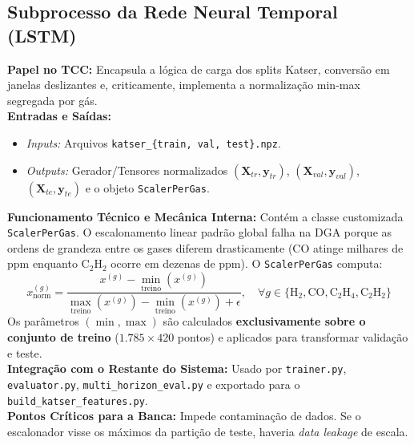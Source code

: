 \documentclass[10pt,a4paper]{article}
\begin{document}
\subsection{Subprocesso da Rede Neural Temporal (LSTM)}

\begin{filebox}
\textbf{Papel no TCC:} Encapsula a lógica de carga dos splits Katser, conversão em janelas deslizantes e, criticamente, implementa a normalização min-max segregada por gás.\\
\textbf{Entradas e Saídas:}
\begin{itemize}[leftmargin=*,itemsep=1pt]
  \item \textit{Inputs:} Arquivos \texttt{katser\_\{train, val, test\}.npz}.
  \item \textit{Outputs:} Gerador/Tensores normalizados $(\mathbf{X}_{tr}, \mathbf{y}_{tr})$, $(\mathbf{X}_{val}, \mathbf{y}_{val})$, $(\mathbf{X}_{te}, \mathbf{y}_{te})$ e o objeto \texttt{ScalerPerGas}.
\end{itemize}
\textbf{Funcionamento Técnico e Mecânica Interna:} Contém a classe customizada \texttt{ScalerPerGas}. O escalonamento linear padrão global falha na DGA porque as ordens de grandeza entre os gases diferem drasticamente ($\text{CO}$ atinge milhares de ppm enquanto $\text{C}_2\text{H}_2$ ocorre em dezenas de ppm). O \texttt{ScalerPerGas} computa:
$$x_{\text{norm}}^{(g)} = \frac{x^{(g)} - \min_{\text{treino}}(x^{(g)})}{\max_{\text{treino}}(x^{(g)}) - \min_{\text{treino}}(x^{(g)}) + \epsilon}, \quad \forall g \in \{\text{H}_2, \text{CO}, \text{C}_2\text{H}_4, \text{C}_2\text{H}_2\}$$
Os parâmetros $(\min, \max)$ são calculados \textbf{exclusivamente sobre o conjunto de treino} ($1.785 \times 420$ pontos) e aplicados para transformar validação e teste.\\
\textbf{Integração com o Restante do Sistema:} Usado por \texttt{trainer.py}, \texttt{evaluator.py}, \texttt{multi\_horizon\_eval.py} e exportado para o \texttt{build\_katser\_features.py}.\\
\textbf{Pontos Críticos para a Banca:} Impede contaminação de dados. Se o escalonador visse os máximos da partição de teste, haveria \textit{data leakage} de escala.
\end{filebox}
\end{document}
